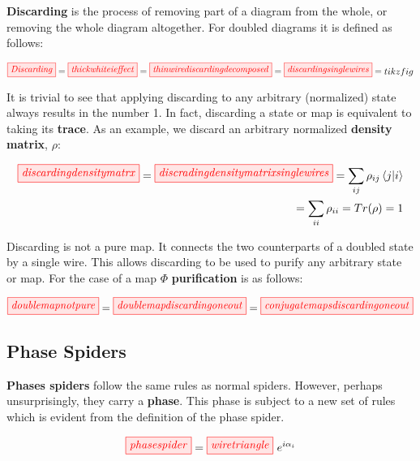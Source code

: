 \documentclass[]{article}
\begin{document}
\textbf{Discarding} is the process of removing part of a diagram from the whole, or removing the whole diagram altogether. For doubled diagrams it is defined as follows:

\begin{equation}
\label{discarding}
\tikzfig{Discarding} = \tikzfig{thickwhiteieffect} = \tikzfig{thinwirediscardingdecomposed} = \tikzfig{discardingsinglewires} = tikzfig
\end{equation}

It is trivial to see that applying discarding to any arbitrary (normalized) state always results in the number 1. In fact, discarding a state or map is equivalent to taking its \textbf{trace}. As an example, we discard an arbitrary normalized \textbf{density matrix}, $\rho$:

\begin{equation}
\begin{split}
\tikzfig{discardingdensitymatrx} = \tikzfig{discradingdensitymatrixsinglewires} = \sum\limits_{ij} \rho_{ij} \bra{j}\ket{i} \\ = \sum\limits_{ii} \rho_{ii} = Tr(\rho) = 1
\end{split}
\end{equation}

Discarding is not a pure map. It connects the two counterparts of a doubled state by a single wire. This allows discarding to be used to purify any arbitrary state or map. For the case of a map $\Phi$ \textbf{purification} is as follows:

\begin{equation}
\tikzfig{doublemapnotpure} = \tikzfig{doublemapdiscardingoneout} = \tikzfig{conjugatemapsdiscardingoneout}
\end{equation}



\subsection{Phase Spiders}
\label{phasespiders}

\textbf{Phases spiders} follow the same rules as normal spiders. However, perhaps unsurprisingly, they carry a \textbf{phase}. This phase is subject to a new set of rules which is evident from the definition of the phase spider. 

\begin{equation}
\label{phasespider}
\tikzfig{phasespider} = \tikzfig{wiretriangle}~e^{i\alpha_i}
\end{equation}
\end{document}
